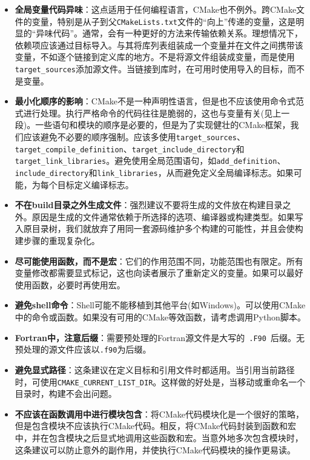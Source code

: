 \begin{itemize}
\item \textbf{全局变量代码异味}：这点适用于任何编程语言，CMake也不例外。跨CMake文件的变量，特别是从子到父\texttt{CMakeLists.txt}文件的“向上”传递的变量，这是明显的“异味代码”。通常，会有一种更好的方法来传输依赖关系。理想情况下，依赖项应该通过目标导入。与其将库列表组装成一个变量并在文件之间携带该变量，不如逐个链接到定义库的地方。不是将源文件组装成变量，而是使用\texttt{target\_sources}添加源文件。当链接到库时，在可用时使用导入的目标，而不是变量。

\item \textbf{最小化顺序的影响}：CMake不是一种声明性语言，但是也不应该使用命令式范式进行处理。执行严格命令的代码往往是脆弱的，这也与变量有关(见上一段)。一些语句和模块的顺序是必要的，但是为了实现健壮的CMake框架，我们应该避免不必要的顺序强制。应该多使用\texttt{target\_sources}、\texttt{target\_compile\_definition}、\texttt{target\_include\_directory}和\texttt{target\_link\_libraries}。避免使用全局范围语句，如\texttt{add\_definition}、\texttt{include\_directory}和\texttt{link\_libraries}，从而避免定义全局编译标志。如果可能，为每个目标定义编译标志。

\item \textbf{不在build目录之外生成文件}：强烈建议不要将生成的文件放在构建目录之外。原因是生成的文件通常依赖于所选择的选项、编译器或构建类型。如果写入原目录树，我们就放弃了用同一套源码维护多个构建的可能性，并且会使构建步骤的重现复杂化。

\item \textbf{尽可能使用函数，而不是宏}：它们的作用范围不同，功能范围也有限定。所有变量修改都需要显式标记，这也向读者展示了重新定义的变量。如果可以最好使用函数，必要时再使用宏。

\item \textbf{避免shell命令}：Shell可能不能移植到其他平台(如Windows)。可以使用CMake中的命令或函数。如果没有可用的CMake等效函数，请考虑调用Python脚本。

\item \textbf{Fortran中，注意后缀}：需要预处理的Fortran源文件是大写的\texttt{ .F90 }后缀。无预处理的源文件应该以\texttt{.f90}为后缀。

\item \textbf{避免显式路径}：这条建议在定义目标和引用文件时都适用。当引用当前路径时，可使用\texttt{CMAKE\_CURRENT\_LIST\_DIR}。这样做的好处是，当移动或重命名一个目录时，构建不会出问题。

\item \textbf{不应该在函数调用中进行模块包含}：将CMake代码模块化是一个很好的策略，但是包含模块不应该执行CMake代码。相反，将CMake代码封装到函数和宏中，并在包含模块之后显式地调用这些函数和宏。当意外地多次包含模块时，这条建议可以防止意外的副作用，并使执行CMake代码模块的操作更易读。

\end{itemize}


